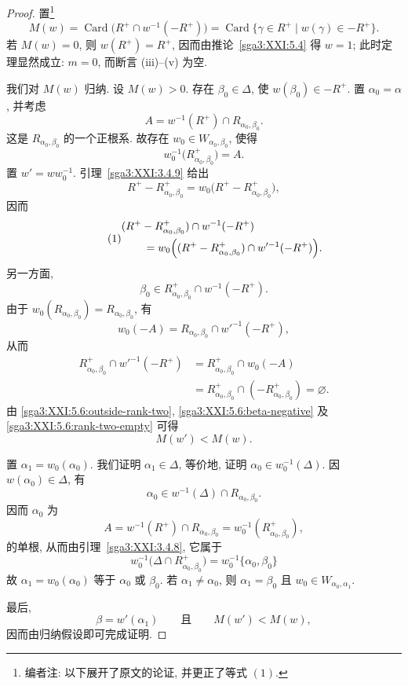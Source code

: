 \begin{proof}
置\footnote{编者注: 以下展开了原文的论证, 并更正了等式 \((1)\).}
\[
 M(w)
 =\operatorname{Card}\bigl(R^+\cap w^{-1}(-R^+)\bigr)
 =\operatorname{Card}\{\gamma\in R^+\mid w(\gamma)\in-R^+\}.
\]
若 \(M(w)=0\), 则 \(w(R^+)=R^+\), 因而由推论~\ref{sga3:XXI:5.4} 得 \(w=1\); 此时定理显然成立: \(m=0\), 而断言 (iii)--(v) 为空.

我们对 \(M(w)\) 归纳. 设 \(M(w)>0\). 存在 \(\beta_0\in\Delta\), 使 \(w(\beta_0)\in-R^+\). 置 \(\alpha_0=\alpha\), 并考虑
\[
 A=w^{-1}(R^+)\cap R_{\alpha_0,\beta_0}.
\]
这是 \(R_{\alpha_0,\beta_0}\) 的一个正根系. 故存在 \(w_0\in W_{\alpha_0,\beta_0}\), 使得
\[
 w_0^{-1}\bigl(R^+_{\alpha_0,\beta_0}\bigr)=A.
\]
置 \(w'=ww_0^{-1}\). 引理~\ref{sga3:XXI:3.4.9} 给出
\[
 R^+-R^+_{\alpha_0,\beta_0}
 =
 w_0\bigl(R^+-R^+_{\alpha_0,\beta_0}\bigr),
\]
因而
\begin{equation}
\tag{1}
\label{sga3:XXI:5.6:outside-rank-two}
\begin{split}
 &(R^+-R^+_{\alpha_0,\beta_0})\cap w^{-1}(-R^+)\\
 &\qquad=
 w_0\Bigl((R^+-R^+_{\alpha_0,\beta_0})
             \cap w'^{-1}(-R^+)\Bigr).
\end{split}
\end{equation}
另一方面,
\begin{equation}
\tag{2}
\label{sga3:XXI:5.6:beta-negative}
 \beta_0\in
 R^+_{\alpha_0,\beta_0}\cap w^{-1}(-R^+).
\end{equation}
由于 \(w_0(R_{\alpha_0,\beta_0})=R_{\alpha_0,\beta_0}\), 有
\[
 w_0(-A)
 =R_{\alpha_0,\beta_0}\cap w'^{-1}(-R^+),
\]
从而
\begin{equation}
\tag{\(2'\)}
\label{sga3:XXI:5.6:rank-two-empty}
\begin{split}
 R^+_{\alpha_0,\beta_0}\cap w'^{-1}(-R^+)
 &=
 R^+_{\alpha_0,\beta_0}\cap w_0(-A)\\
 &=
 R^+_{\alpha_0,\beta_0}\cap(-R^+_{\alpha_0,\beta_0})
 =\varnothing.
\end{split}
\end{equation}
由 \eqref{sga3:XXI:5.6:outside-rank-two}, \eqref{sga3:XXI:5.6:beta-negative} 及 \eqref{sga3:XXI:5.6:rank-two-empty} 可得
\[
 M(w')<M(w).
\]

置 \(\alpha_1=w_0(\alpha_0)\). 我们证明 \(\alpha_1\in\Delta\), 等价地, 证明 \(\alpha_0\in w_0^{-1}(\Delta)\). 因 \(w(\alpha_0)\in\Delta\), 有
\[
 \alpha_0\in
 w^{-1}(\Delta)\cap R_{\alpha_0,\beta_0}.
\]
因而 \(\alpha_0\) 为
\[
 A
 =w^{-1}(R^+)\cap R_{\alpha_0,\beta_0}
 =w_0^{-1}(R^+_{\alpha_0,\beta_0}),
\]
的单根, 从而由引理~\ref{sga3:XXI:3.4.8}, 它属于
\[
 w_0^{-1}\bigl(\Delta\cap R^+_{\alpha_0,\beta_0}\bigr)
 =
 w_0^{-1}\{\alpha_0,\beta_0\}
\]
故 \(\alpha_1=w_0(\alpha_0)\) 等于 \(\alpha_0\) 或 \(\beta_0\). 若 \(\alpha_1\ne\alpha_0\), 则 \(\alpha_1=\beta_0\) 且 \(w_0\in W_{\alpha_0,\alpha_1}\).

最后,
\[
 \beta=w'(\alpha_1)
 \qquad\text{且}\qquad
 M(w')<M(w),
\]
因而由归纳假设即可完成证明.
\end{proof}

